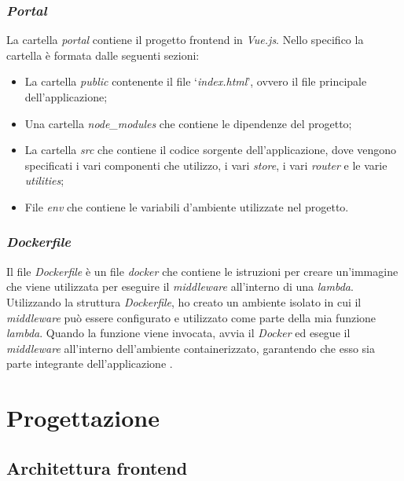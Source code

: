 \subsubsection*{\emph{Portal}}\label{subsubsec:portal}
La cartella \textit{portal} contiene il progetto frontend in \textit{Vue.js}. Nello specifico la cartella è formata dalle seguenti sezioni:
\begin{itemize}
  \item La cartella \textit{public} contenente il file `\textit{index.html}', ovvero il file principale dell'applicazione;
  \item Una cartella \textit{node\_modules} che contiene le dipendenze del progetto;
  \item La cartella \textit{src} che contiene il codice sorgente dell'applicazione, dove vengono specificati i vari componenti che utilizzo, i vari \textit{store}, i vari \textit{router} e le varie \textit{utilities};
  \item File \textit{env} che contiene le variabili d'ambiente utilizzate nel progetto.
\end{itemize}

\subsubsection*{\emph{Dockerfile}}\label{subsubsec:dockerfile}
Il file \textit{Dockerfile} è un file \textit{docker} che contiene le istruzioni per creare un'immagine che viene utilizzata per eseguire il \textit{middleware} all'interno di una \textit{lambda}.\\
Utilizzando la struttura \textit{Dockerfile}, ho creato un ambiente isolato in cui il \textit{middleware} può essere configurato e utilizzato come parte della mia funzione 
\textit{lambda}. Quando la funzione viene invocata, avvia il \textit{Docker}  ed esegue il \textit{middleware} all'interno dell'ambiente containerizzato, 
garantendo che esso sia parte integrante dell'applicazione .

\section{Progettazione}\label{sec:progettazione}

\subsection{Architettura frontend}\label{subsec:architettura-front-end}
